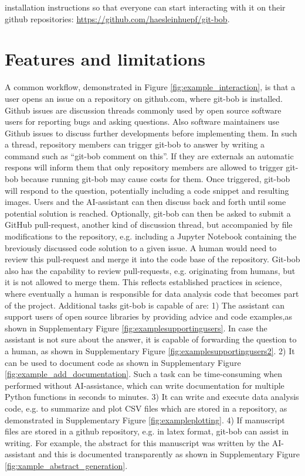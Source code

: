 \documentclass{ecai}
\begin{document}
installation instructions so that everyone can start interacting with it on their github repositories: \url{https://github.com/haesleinhuepf/git-bob}. 


\section{Features and limitations}

A common workflow, demonstrated in Figure \ref{fig:example_interaction}, is that a user opens an issue on a repository on github.com, where git-bob is installed. Github issues are discussion threads commonly used by open source software users for reporting bugs and asking questions. Also software maintainers use Github issues to discuss further developments before implementing them. In such a thread, repository members can trigger git-bob to answer by writing a command such as ``git-bob comment on this''. If they are externals an automatic respons will inform them that only repository members are allowed to trigger git-bob because running git-bob may cause costs for them. Once triggered, git-bob will respond to the question, potentially including a code snippet and resulting images. Users and the AI-assistant can then discuss back and forth until some potential solution is reached. Optionally, git-bob can then be asked to submit a GitHub pull-request, another kind of discussion thread, but accompanied by file modifications to the repository, e.g. including a Jupyter Notebook containing the breviously discussed code solution to a given issue. A human would need to review this pull-request and merge it into the code base of the repository. Git-bob also has the capability to review pull-requests, e.g. originating from humans, but it is not allowed to merge them. This reflects established practices in science, where eventually a human is responsible for data analysis code that becomes part of the project. Additional tasks git-bob is capable of are: 1) The assistant can support users of open source libraries by providing advice and code examples,as shown in Supplementary Figure \ref{fig:examplesupportingusers}. In case the assistant is not sure about the answer, it is capable of forwarding the question to a human, as shown in Supplementary Figure \ref{fig:examplesupportingusers2}. 2) It can be used to document code as shown in Supplementary Figure \ref{fig:example_add_documentation}. Such a task can be time-consuming when performed without AI-assistance, which can write documentation for multiple Python functions in seconds to minutes. 3) It can write and execute data analysis code, e.g. to summarize and plot CSV files which are stored in a repository, as demonstrated in Supplementary Figure \ref{fig:exampleplotting}. 4) If manuscript files are stored in a github repository, e.g. in latex format, git-bob can assist in writing. For example, the abstract for this manuscript was written by the AI-assistant and this is documented transparently as shown in Supplementary Figure \ref{fig:xample_abstract_generation}.
\end{document}
